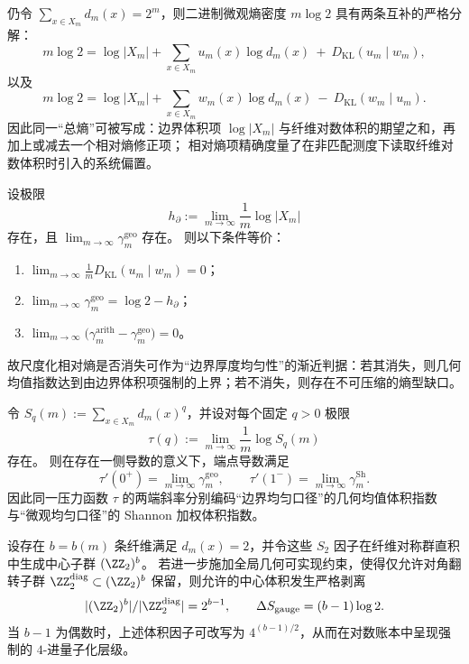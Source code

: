 \begin{conclusion}\label{con:xi-micro-entropy-holographic-two-splits}
仍令 \(\sum_{x\in X_m} d_m(x)=2^m\)，则二进制微观熵密度 \(m\log 2\) 具有两条互补的严格分解：
\[
m\log 2
=\log|X_m|
+\sum_{x\in X_m}u_m(x)\log d_m(x)\ +\ D_{\mathrm{KL}}(u_m\mid w_m),
\]
以及
\[
m\log 2
=\log|X_m|
+\sum_{x\in X_m}w_m(x)\log d_m(x)\ -\ D_{\mathrm{KL}}(w_m\mid u_m).
\]
因此同一“总熵”可被写成：边界体积项 \(\log|X_m|\) 与纤维对数体积的期望之和，再加上或减去一个相对熵修正项；
相对熵项精确度量了在非匹配测度下读取纤维对数体积时引入的系统偏置。
\end{conclusion}

\begin{conclusion}\label{con:xi-equimultiplicity-kl-vanishing}
设极限
\[
h_\partial:=\lim_{m\to\infty}\frac{1}{m}\log|X_m|
\]
存在，且 \(\lim_{m\to\infty}\gamma_m^{\mathrm{geo}}\) 存在。
则以下条件等价：
\begin{enumerate}
  \item \(\displaystyle \lim_{m\to\infty}\frac{1}{m}D_{\mathrm{KL}}(u_m\mid w_m)=0\)；
  \item \(\displaystyle \lim_{m\to\infty}\gamma_m^{\mathrm{geo}}=\log 2-h_\partial\)；
  \item \(\displaystyle \lim_{m\to\infty}\bigl(\gamma_m^{\mathrm{arith}}-\gamma_m^{\mathrm{geo}}\bigr)=0\)。
\end{enumerate}
故尺度化相对熵是否消失可作为“边界厚度均匀性”的渐近判据：若其消失，则几何均值指数达到由边界体积项强制的上界；若不消失，则存在不可压缩的熵型缺口。
\end{conclusion}

\begin{conclusion}\label{con:xi-pressure-endpoints-geo-shannon}
令
\(
S_q(m):=\sum_{x\in X_m} d_m(x)^q
\)，并设对每个固定 \(q>0\) 极限
\[
\tau(q):=\lim_{m\to\infty}\frac{1}{m}\log S_q(m)
\]
存在。
则在存在一侧导数的意义下，端点导数满足
\[
\tau'(0^+)=\lim_{m\to\infty}\gamma_m^{\mathrm{geo}},
\qquad
\tau'(1^-)=\lim_{m\to\infty}\gamma_m^{\mathrm{Sh}}.
\]
因此同一压力函数 \(\tau\) 的两端斜率分别编码“边界均匀口径”的几何均值体积指数与“微观均匀口径”的 Shannon 加权体积指数。
\end{conclusion}

\begin{conclusion}\label{con:xi-gauge-center-diagonal-strip}
设存在 \(b=b(m)\) 条纤维满足 \(d_m(x)=2\)，并令这些 \(S_2\) 因子在纤维对称群直积中生成中心子群 \((\ZZ_2)^b\)。
若进一步施加全局几何可实现约束，使得仅允许对角翻转子群 \(\ZZ_2^{\mathrm{diag}}\subset(\ZZ_2)^b\) 保留，则允许的中心体积发生严格剥离
\[
|(\ZZ_2)^b|/|\ZZ_2^{\mathrm{diag}}|=2^{b-1},
\qquad
\Delta S_{\mathrm{gauge}}=(b-1)\log 2.
\]
当 \(b-1\) 为偶数时，上述体积因子可改写为 \(4^{(b-1)/2}\)，从而在对数账本中呈现强制的 \(4\)-进量子化层级。
\end{conclusion}

